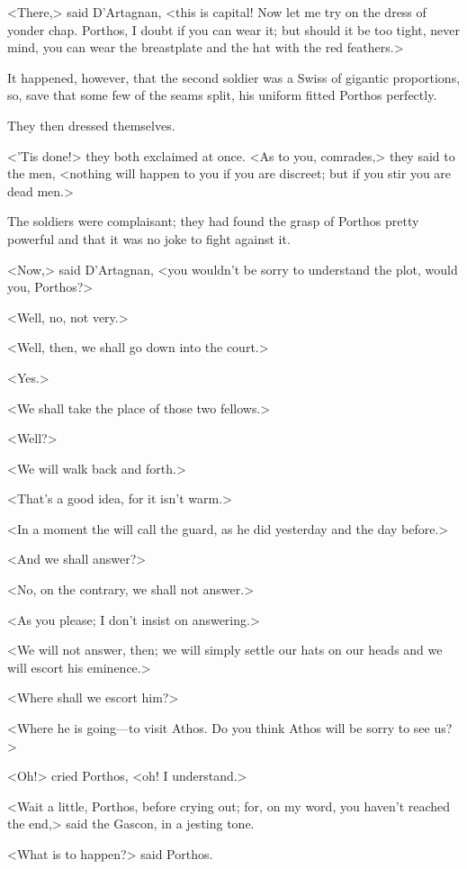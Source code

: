 <There,> said D'Artagnan, <this is capital! Now let me try on the dress of yonder chap. Porthos, I doubt if you can wear it; but should it be too tight, never mind, you can wear the breastplate and the hat with the red feathers.>

It happened, however, that the second soldier was a Swiss of gigantic proportions, so, save that some few of the seams split, his uniform fitted Porthos perfectly.

They then dressed themselves.

<'Tis done!> they both exclaimed at once. <As to you, comrades,> they said to the men, <nothing will happen to you if you are discreet; but if you stir you are dead men.>

The soldiers were complaisant; they had found the grasp of Porthos pretty powerful and that it was no joke to fight against it.

<Now,> said D'Artagnan, <you wouldn't be sorry to understand the plot, would you, Porthos?>

<Well, no, not very.>

<Well, then, we shall go down into the court.>

<Yes.>

<We shall take the place of those two fellows.>

<Well?>

<We will walk back and forth.>

<That's a good idea, for it isn't warm.>

<In a moment the  will call the guard, as he did yesterday and the day before.>

<And we shall answer?>

<No, on the contrary, we shall not answer.>

<As you please; I don't insist on answering.>

<We will not answer, then; we will simply settle our hats on our heads and we will escort his eminence.>

<Where shall we escort him?>

<Where he is going—to visit Athos. Do you think Athos will be sorry to see us?>

<Oh!> cried Porthos, <oh! I understand.>

<Wait a little, Porthos, before crying out; for, on my word, you haven't reached the end,> said the Gascon, in a jesting tone.

<What is to happen?> said Porthos.

